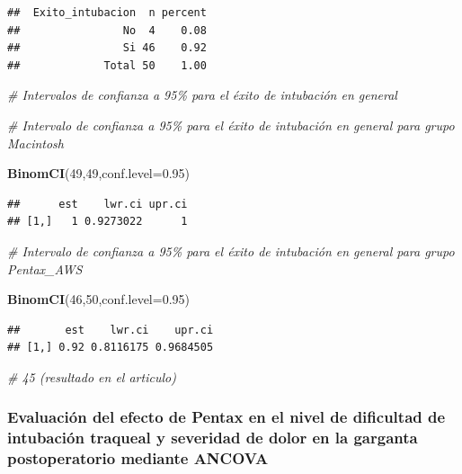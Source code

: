 \documentclass[
]{article}
\newenvironment{Shaded}{\begin{snugshade}}{\end{snugshade}}
\newcommand{\AttributeTok}[1]{\textcolor[rgb]{0.13,0.29,0.53}{#1}}
\newcommand{\CommentTok}[1]{\textcolor[rgb]{0.56,0.35,0.01}{\textit{#1}}}
\newcommand{\DecValTok}[1]{\textcolor[rgb]{0.00,0.00,0.81}{#1}}
\newcommand{\FloatTok}[1]{\textcolor[rgb]{0.00,0.00,0.81}{#1}}
\newcommand{\FunctionTok}[1]{\textcolor[rgb]{0.13,0.29,0.53}{\textbf{#1}}}
\newcommand{\NormalTok}[1]{#1}
\begin{document}
\begin{verbatim}
##  Exito_intubacion  n percent
##                No  4    0.08
##                Si 46    0.92
##             Total 50    1.00
\end{verbatim}

\begin{Shaded}
\begin{Highlighting}[]
\CommentTok{\# Intervalos de confianza a 95\% para el éxito de intubación en general}

\CommentTok{\# Intervalo de confianza a 95\% para el éxito de intubación en general para grupo Macintosh}

\FunctionTok{BinomCI}\NormalTok{(}\DecValTok{49}\NormalTok{,}\DecValTok{49}\NormalTok{,}\AttributeTok{conf.level=}\FloatTok{0.95}\NormalTok{)}
\end{Highlighting}
\end{Shaded}

\begin{verbatim}
##      est    lwr.ci upr.ci
## [1,]   1 0.9273022      1
\end{verbatim}

\begin{Shaded}
\begin{Highlighting}[]
\CommentTok{\# Intervalo de confianza a 95\% para el éxito de intubación en general para grupo Pentax\_AWS}

\FunctionTok{BinomCI}\NormalTok{(}\DecValTok{46}\NormalTok{,}\DecValTok{50}\NormalTok{,}\AttributeTok{conf.level=}\FloatTok{0.95}\NormalTok{)}
\end{Highlighting}
\end{Shaded}

\begin{verbatim}
##       est    lwr.ci    upr.ci
## [1,] 0.92 0.8116175 0.9684505
\end{verbatim}

\begin{Shaded}
\begin{Highlighting}[]
\CommentTok{\# 45 (resultado en el articulo)}
\end{Highlighting}
\end{Shaded}

\hypertarget{evaluaciuxf3n-del-efecto-de-pentax-en-el-nivel-de-dificultad-de-intubaciuxf3n-traqueal-y-severidad-de-dolor-en-la-garganta-postoperatorio-mediante-ancova}{%
\subsubsection{Evaluación del efecto de Pentax en el nivel de dificultad
de intubación traqueal y severidad de dolor en la garganta
postoperatorio mediante
ANCOVA}\label{evaluaciuxf3n-del-efecto-de-pentax-en-el-nivel-de-dificultad-de-intubaciuxf3n-traqueal-y-severidad-de-dolor-en-la-garganta-postoperatorio-mediante-ancova}}
\end{document}
